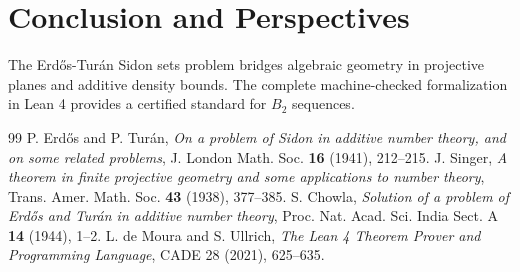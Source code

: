 \documentclass[11pt,a4paper]{article}
\theoremstyle{definition}
\begin{document}
\section{Conclusion and Perspectives}
The Erd\H{o}s-Tur\'an Sidon sets problem bridges algebraic geometry in projective planes and additive density bounds. The complete machine-checked formalization in Lean 4 provides a certified standard for $B_2$ sequences.

\begin{thebibliography}{99}
 P. Erd\H{o}s and P. Tur\'an, \textit{On a problem of Sidon in additive number theory, and on some related problems}, J. London Math. Soc. \textbf{16} (1941), 212--215.
 J. Singer, \textit{A theorem in finite projective geometry and some applications to number theory}, Trans. Amer. Math. Soc. \textbf{43} (1938), 377--385.
 S. Chowla, \textit{Solution of a problem of Erd\H{o}s and Tur\'an in additive number theory}, Proc. Nat. Acad. Sci. India Sect. A \textbf{14} (1944), 1--2.
 L. de Moura and S. Ullrich, \textit{The Lean 4 Theorem Prover and Programming Language}, CADE 28 (2021), 625--635.
\end{thebibliography}
\end{document}
